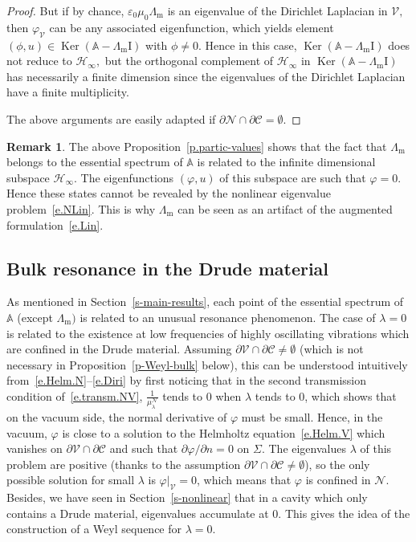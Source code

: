 \documentclass[11pt]{article}
\theoremstyle{definition}
\newtheorem{rema}[theo]{Remark}
\numberwithin{equation}{section}
\numberwithin{figure}{section}
\numberwithin{table}{section}
\DeclareMathOperator{\Ker}{Ker}
\newcommand{\epsl}{\varepsilon}
\newcommand{\calC}{\mathcal{C}}
\newcommand{\calH}{\mathcal{H}}
\newcommand{\calN}{\mathcal{N}}
\newcommand{\calV}{\mathcal{V}}
\newcommand{\bbA}{\mathbb{A}}
\newcommand{\Ident}{{\mathrm{I}}}
\newcommand{\Lm}{{\Lambda_{\mathrm{m}}}}
\begin{document}
\begin{proof}
But if by chance, $\epsl_0 \mu_0 \Lm$ is an eigenvalue of the Dirichlet Laplacian in $\calV,$ then $\varphi_\calV$ can be any associated eigenfunction, which yields element $(\phi,u) \in \Ker(\bbA - \Lm\Ident)$ with $\phi \neq 0.$ Hence in this case, $\Ker(\bbA - \Lm\Ident)$ does not reduce to $\calH_\infty,$ but the orthogonal complement of $\calH_\infty$ in $\Ker(\bbA - \Lm\Ident)$ has necessarily a finite dimension since the eigenvalues of the Dirichlet Laplacian have a finite multiplicity.

The above arguments are easily adapted if $\partial\calN \cap \partial\calC = \emptyset.$
\end{proof}

\begin{rema}\label{r-artifact}
The above Proposition~\ref{p.partic-values} shows that the fact that $\Lm$ belongs to the essential spectrum of $\bbA$ is related to the infinite dimensional subspace $\calH_\infty.$ The eigenfunctions $(\varphi,u)$ of this subspace are such that $\varphi = 0.$ Hence these states cannot be revealed by the nonlinear eigenvalue problem~\eqref{e.NLin}. This is why $\Lm$ can be seen as an artifact of the augmented formulation~\eqref{e.Lin}.
\end{rema}


\subsection{Bulk resonance in the Drude material}\label{s-bulk-reson}

As mentioned in Section~\ref{s-main-results}, each point of the essential spectrum of $\bbA$ (except $\Lm)$ is related to an unusual resonance phenomenon. The case of $\lambda = 0$ is related to the existence at low frequencies of highly oscillating vibrations which are confined in the Drude material. Assuming $\partial\calV \cap \partial\calC \neq \emptyset$ (which is not necessary in Proposition~\ref{p-Weyl-bulk} below), this can be understood intuitively from~\eqref{e.Helm.N}--\eqref{e.Diri} by first noticing that in the second transmission condition of~\eqref{e.transm.NV}, $\frac{1}{\mu_\lambda^\calN}$ tends to $0$ when $\lambda$ tends to $0$, which shows that on the vacuum side, the normal derivative of $\varphi$ must be small. Hence, in the vacuum, $\varphi$ is close to a solution to the Helmholtz equation~\eqref{e.Helm.V} which vanishes on $\partial\calV \cap \partial\calC$ and such that $\partial\varphi/\partial n = 0$ on $\Sigma.$ The eigenvalues $\lambda$ of this problem are positive (thanks to the assumption $\partial\calV \cap \partial\calC \neq \emptyset$), so the only possible solution for small $\lambda$ is $\varphi|_\calV = 0$, which means that $\varphi$ is confined in $\calN.$ Besides, we have seen in Section~\ref{s-nonlinear} that in a cavity which only contains a Drude material, eigenvalues accumulate at 0. This gives the idea of the construction of a Weyl sequence for $\lambda = 0.$
\end{document}
